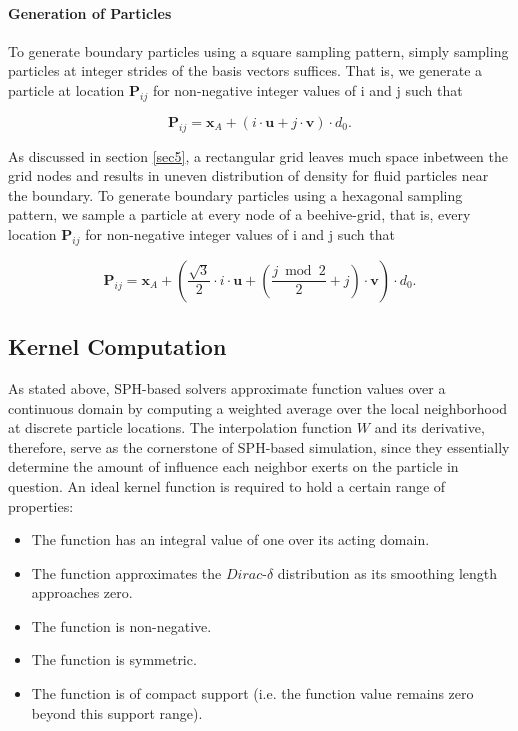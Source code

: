 \documentclass[
	11pt, 
	DIV10,
	ngerman,
	a4paper, 
	oneside, 
	headings=normal, 
	captions=tableheading,
	final, 
	numbers=noenddot
]{scrartcl}
\begin{document}
\paragraph{Generation of Particles} To generate boundary particles using a square sampling pattern, simply sampling particles at integer strides of the basis vectors suffices. That is, we generate a particle at location $ \boldsymbol{P}_{ij} $ for non-negative integer values of i and j such that

\begin{equation}
	\label{eq8}
	\boldsymbol{P}_{ij} = \boldsymbol{x}_{A} + \left(i \cdot \boldsymbol{u} + j \cdot \boldsymbol{v}\right) \cdot d_{0}.
\end{equation}

As discussed in section \ref{sec5}, a rectangular grid leaves much space inbetween the grid nodes and results in uneven distribution of density for fluid particles near the boundary. To generate boundary particles using a hexagonal sampling pattern, we sample a particle at every node of a beehive-grid, that is, every location $ \boldsymbol{P}_{ij} $ for non-negative integer values of i and j such that

\begin{equation}
	\label{eq9}
	\boldsymbol{P}_{ij} = \boldsymbol{x}_{A} + \left(\frac{\sqrt{3}}{2} \cdot i \cdot \boldsymbol{u} + \left( \frac{j \bmod 2}{2} + j\right) \cdot \boldsymbol{v}\right) \cdot d_{0}.
\end{equation}

\subsection{Kernel Computation}

As stated above, SPH-based solvers approximate function values over a continuous domain by computing a weighted average over the local neighborhood at discrete particle locations. The interpolation function $ W $ and its derivative, therefore, serve as the cornerstone of SPH-based simulation, since they essentially determine the amount of influence each neighbor exerts on the particle in question. An ideal kernel function is required to hold a certain range of properties:

\begin{itemize}
    \item The function has an integral value of one over its acting domain.
    \item The function approximates the $ Dirac $-$ \delta $ distribution as its smoothing length approaches zero.
    \item The function is non-negative.
    \item The function is symmetric.
    \item The function is of compact support (i.e. the function value remains zero beyond this support range).
\end{itemize}
\end{document}
